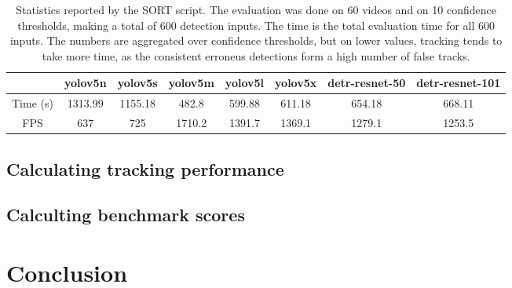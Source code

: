 \begin{table}[h]
    \begin{tabular}{|c|c|c|c|c|c|c|c|}
        \hline
         & yolov5n & yolov5s & yolov5m & yolov5l & yolov5x & detr-resnet-50 & detr-resnet-101 \\
        \hline
        \hline
        Time (s) & 1313.99 & 1155.18 & 482.8 & 599.88 & 611.18 & 654.18 & 668.11\\
        \hline
        \hline
        FPS  & 637 & 725 & 1710.2 & 1391.7 & 1369.1 & 1279.1 & 1253.5 \\
        \hline
    \end{tabular}
    \caption{Statistics reported by the SORT script. The evaluation was done on 60 videos and on 10 confidence thresholds, making a total of 600 detection inputs. The time is the total evaluation time for all 600 inputs. The numbers are aggregated over confidence thresholds, but on lower values, tracking tends to take more time, as the consistent erroneus detections form a high number of false tracks.}
    \label{tab:sort-times}
\end{table}

\subsection{Calculating tracking performance}

\subsection{Calculting benchmark scores}

\section{Conclusion}






